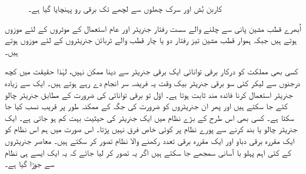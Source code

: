 \begin{figure}
%
\caption{کاربن بُش اور سرک چھلوں سے لچھے تک برقی رو پہنچایا گیا ہے۔}
\label{شکل_معاصر_سرک_چھلے}
\end{figure}

اُبھرے قطب مشین پانی سے چلنے والے سست رفتار جنریٹر اور  عام استعمال کے موٹروں کے لئے موزوں ہوتے ہیں جبکہ ہموار قطب مشین تیز رفتار دو یا چار قطب والے ٹربائن جنریٹروں کے لئے موزوں ہوتے ہیں۔

کسی بھی مملکت کو درکار برقی توانائی ایک برقی جنریٹر سے دینا ممکن نہیں، لہٰذا حقیقت میں کچھ درجنوں سے لیکر کئی سو برقی جنریٹر بیک وقت یہ فریضہ سر انجام دے رہے ہوتے ہیں۔ ایک سے زیادہ جنریٹر استعمال کرنا فائدہ مند ثابت ہوتا ہے۔ اوّل تو برقی توانائی کی ضرورت کے مطابق جنریٹر چالو کئے جا سکتے ہیں اور پھر ان جنریٹروں کو ضرورت کی جگہ کے ممکنہ طور پر قریب نسب کیا جا سکتا ہے۔ کسی بھی اس طرح کے بڑے نظام میں ایک جنریٹر کی حیثیت بہت کم ہو جاتی ہے۔ ایک جنریٹر چالو یا بند کرنے سے پورے نظام پر کوئی خاص فرق نہیں پڑتا۔ اس صورت میں ہم اس نظام کو ایک مقررہ برقی دباو اور ایک مقررہ برقی تعدد رکھنے والا نظام تصور کر سکتے ہیں۔ معاصر جنریٹروں کے کئی اہم پہلو با آسانی سمجھے جا سکتے ہیں اگر یہ تصور کر لیا جائے کہ یہ ایک ایسے ہی نظام سے جوڑا گیا ہے۔

